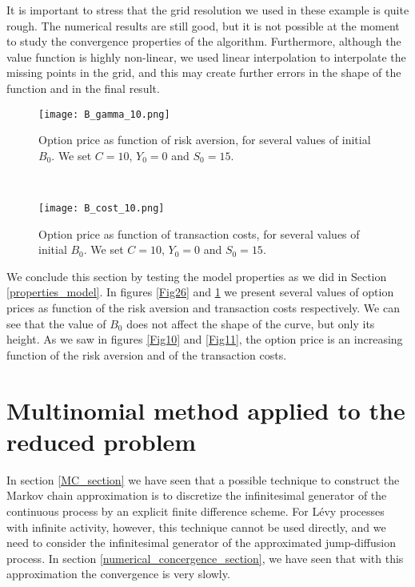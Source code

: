 It is important to stress that the grid resolution we used in these example is quite rough. The numerical results are still good, but it is not possible at the moment 
to study the convergence properties of the algorithm. 
Furthermore, although the value function is highly non-linear, we used linear interpolation to interpolate the missing points in the grid, and this may create further errors in the shape
of the function and in the final result.

\begin{figure}[t!]
 \begin{minipage}[b]{0.5\linewidth}
   \centering
   \texttt{[image: B\_gamma\_10.png]}
   \caption{Option price as function of risk aversion, for several values of initial $B_0$. We set $C=10$, $Y_0=0$ and $S_0=15$.}
   \label{Fig26} 
 \end{minipage}
 \ \hspace{2mm} \hspace{3mm} \
 \begin{minipage}[b]{0.5\linewidth}
   \texttt{[image: B\_cost\_10.png]}
   \caption{Option price as function of transaction costs, for several values of initial $B_0$. We set $C=10$, $Y_0=0$ and $S_0=15$.}
   \label{Fig25}
 \end{minipage}
\end{figure}  

We conclude this section by testing the model properties as we did in Section \ref{properties_model}. 
In figures \ref{Fig26} and \ref{Fig25} we present several values of option prices as function of the risk aversion and transaction costs respectively.  
We can see that the value of $B_0$ does not affect the shape of the curve, but only its height. 
As we saw in figures \ref{Fig10} and \ref{Fig11}, the option price is an increasing function of the risk aversion and of the transaction costs.


\section{Multinomial method applied to the reduced problem}\label{multinomial_section}

In section \ref{MC_section} we have seen that a possible technique to construct the Markov chain approximation is to discretize the infinitesimal generator of the continuous process
by an explicit finite difference scheme.
For Lévy processes with infinite activity, however, this technique cannot be used directly, and we need to consider the infinitesimal generator of the approximated 
jump-diffusion process.
In section \ref{numerical_concergence_section}, we have seen that with this approximation the convergence is very slowly.

